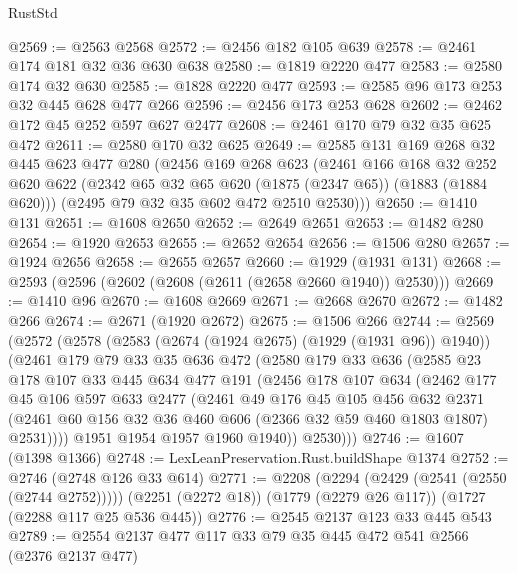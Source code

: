 \begin{lexlean}{RustStd}
\begin{coremodule}
@2569 := @2563 @2568
@2572 := @2456 @182 @105 @639
@2578 := @2461 @174 @181 @32 @36 @630 @638
@2580 := @1819 @2220 @477
@2583 := @2580 @174 @32 @630
@2585 := @1828 @2220 @477
@2593 := @2585 @96 @173 @253 @32 @445 @628 @477 @266
@2596 := @2456 @173 @253 @628
@2602 := @2462 @172 @45 @252 @597 @627 @2477
@2608 := @2461 @170 @79 @32 @35 @625 @472
@2611 := @2580 @170 @32 @625
@2649 := @2585
    @131
    @169
    @268
    @32
    @445
    @623
    @477
    @280
    (@2456
      @169
      @268
      @623
      (@2461
        @166
        @168
        @32
        @252
        @620
        @622
        (@2342 @65 @32 @65 @620 (@1875 (@2347 @65)) (@1883 (@1884 @620)))
        (@2495 @79 @32 @35 @602 @472 @2510 @2530)))
@2650 := @1410 @131
@2651 := @1608 @2650
@2652 := @2649 @2651
@2653 := @1482 @280
@2654 := @1920 @2653
@2655 := @2652 @2654
@2656 := @1506 @280
@2657 := @1924 @2656
@2658 := @2655 @2657
@2660 := @1929 (@1931 @131)
@2668 := @2593 (@2596 (@2602 (@2608 (@2611 (@2658 @2660 @1940)) @2530)))
@2669 := @1410 @96
@2670 := @1608 @2669
@2671 := @2668 @2670
@2672 := @1482 @266
@2674 := @2671 (@1920 @2672)
@2675 := @1506 @266
@2744 := @2569
    (@2572
      (@2578
        (@2583 (@2674 (@1924 @2675) (@1929 (@1931 @96)) @1940))
        (@2461
          @179
          @79
          @33
          @35
          @636
          @472
          (@2580
            @179
            @33
            @636
            (@2585
              @23
              @178
              @107
              @33
              @445
              @634
              @477
              @191
              (@2456
                @178
                @107
                @634
                (@2462
                  @177
                  @45
                  @106
                  @597
                  @633
                  @2477
                  (@2461
                    @49
                    @176
                    @45
                    @105
                    @456
                    @632
                    @2371
                    (@2461 @60 @156 @32 @36 @460 @606 (@2366 @32 @59 @460 @1803 @1807) @2531))))
              @1951
              @1954
              @1957
              @1960
              @1940))
          @2530)))
@2746 := @1607 (@1398 @1366)
@2748 := LexLeanPreservation.Rust.buildShape @1374
@2752 := @2746 (@2748 @126 @33 @614)
@2771 := @2208
    (@2294 (@2429 (@2541 (@2550 (@2744 @2752)))))
    (@2251 (@2272 @18))
    (@1779 (@2279 @26 @117))
    (@1727 (@2288 @117 @25 @536 @445))
@2776 := @2545 @2137 @123 @33 @445 @543
@2789 := @2554 @2137 @477 @117 @33 @79 @35 @445 @472 @541 @2566 (@2376 @2137 @477)

\end{coremodule}
\end{lexlean}
